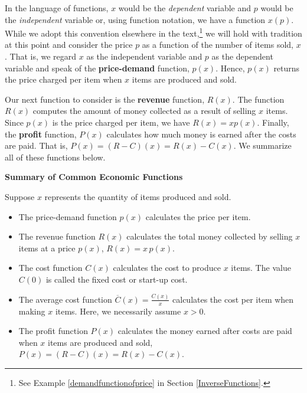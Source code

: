 \documentclass{ximera}
\begin{document}
In the language of functions, $x$ would be the \textit{dependent} variable and $p$ would be the \textit{independent} variable or, using function notation, we have a function $x(p)$.  While we adopt this convention elsewhere in the text,\footnote{See Example \ref{demandfunctionofprice} in Section \ref{InverseFunctions}.} we will hold with tradition at this point and consider the price $p$ as a function of the number of items sold, $x$.  That is, we regard $x$ as the independent variable and $p$ as the dependent variable and speak of the \textbf{price-demand} function, $p(x)$.  Hence, $p(x)$ returns the price charged per item when $x$ items are produced and sold.  

Our next function to consider is the \textbf{revenue} function, $R(x)$.  The function $R(x)$ computes the amount of money collected as a result of selling $x$ items.  Since $p(x)$ is the price charged per item, we have $R(x)= x p(x)$.  Finally, the \textbf{profit} function, $P(x)$ calculates how much money is earned after the costs are paid.  That is, $P(x) = (R-C)(x) = R(x) - C(x)$.  We summarize all of these functions below.


\label{pricerevenuecostprofit}

\centerline{\textbf{Summary of Common Economic Functions}} 

 Suppose $x$ represents the quantity of items produced and sold.

\begin{itemize}

\item  The price-demand function $p(x)$ calculates the price per item.

\item  The revenue function $R(x)$ calculates the total money collected by selling $x$ items at a price $p(x)$,  $R(x) = x \, p(x)$.

\item  The cost function $C(x)$  calculates the cost to produce $x$ items.  The value $C(0)$ is called the fixed cost or start-up cost.

\item  The average cost function $\overline{C}(x) = \frac{C(x)}{x}$ calculates the cost per item when making $x$ items.  Here, we necessarily assume $x > 0$.

\item  The profit function $P(x)$ calculates the money earned after costs are paid when $x$ items are produced and sold, $P(x) = (R-C)(x) = R(x) - C(x)$.

\end{itemize}
\end{document}
